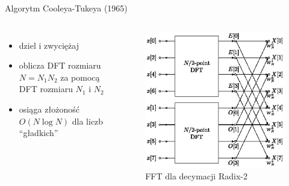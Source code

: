 \documentclass[polish, 12pt, aspectratio=169]{beamer}
\begin{document}
\begin{frame}{Algorytm Cooleya-Tukeya (1965)}
    \begin{columns}
        \begin{itemize}
            \setlength\itemsep{1em}
            \item dziel i zwyciężaj
            \item oblicza DFT rozmiaru \( N = N_1 N_2 \) za pomocą DFT rozmiaru \( N_1 \) i \( N_2 \)
            \item osiąga złożoność \( O(N \log N) \) dla liczb \enquote{gładkich}
        \end{itemize}
    \pause{}
        \vspace{1em}
        \begin{figure}
            \includegraphics[width=0.9\linewidth]{img/fft-diagram.eps}
            \caption*{FFT dla decymacji Radix-2}
        \end{figure}
    \end{columns}
\end{frame}

\end{document}
